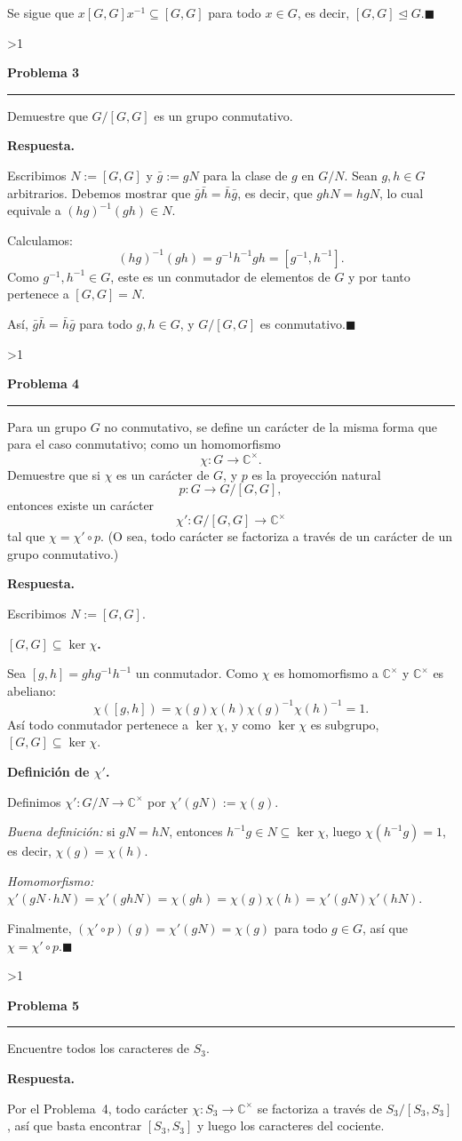 \documentclass[10pt,a4paper]{article}
\newcommand{\CC}{\mathbb{C}}
\newcommand{\inlinehead}[2][repblue]{%
  \par\smallskip
  {\color{#1}\bfseries #2.}\hspace{0.45em}%
}
\newcommand{\blockhead}[2][repteal]{%
  \par\smallskip
  {\color{#1}\bfseries #2.}\par\nobreak\smallskip
}
\newcommand{\answer}{\inlinehead{Respuesta}}
\newcommand{\subhead}[1]{\blockhead{#1}}
\newcounter{probcnt}
\newcommand{\problem}[2]{%
  \stepcounter{probcnt}%
  \ifnum\value{probcnt}>1\newpage\fi
  \par\vspace{0.25em}
  {\large\bfseries\color{repblue} Problema #1}\par
  {\color{repline}\rule{\linewidth}{0.55pt}}\par
  \begin{tcolorbox}[
    breakable,
    colback=white,
    colframe=repline,
    borderline west={1.6pt}{0pt}{repteal},
    left=0.7em,
    right=0.7em,
    top=0.35em,
    bottom=0.3em,
    before skip=0.35em,
    after skip=0.45em
  ]
    #2
  \end{tcolorbox}
}
\begin{document}
Se sigue que $x[G,G]x^{-1}\subseteq [G,G]$ para todo $x\in G$, es decir,
$[G,G]\trianglelefteq G$.\hfill$\blacksquare$

\problem{3}{%
Demuestre que $G/[G,G]$ es un grupo conmutativo.
}

\answer
Escribimos $N:=[G,G]$ y $\bar g:=gN$ para la clase de $g$ en $G/N$.
Sean $g,h\in G$ arbitrarios. Debemos mostrar que $\bar g\bar h=\bar h\bar g$,
es decir, que $ghN=hgN$, lo cual equivale a $(hg)^{-1}(gh)\in N$.

Calculamos:
\[
  (hg)^{-1}(gh)=g^{-1}h^{-1}gh=[g^{-1},h^{-1}].
\]
Como $g^{-1},h^{-1}\in G$, este es un conmutador de elementos de $G$ y por
tanto pertenece a $[G,G]=N$.

Así, $\bar g\bar h=\bar h\bar g$ para todo $g,h\in G$, y $G/[G,G]$ es
conmutativo.\hfill$\blacksquare$

\problem{4}{%
Para un grupo $G$ no conmutativo, se define un carácter de la misma forma
que para el caso conmutativo; como un homomorfismo
\[
  \chi \colon G \to \CC^\times.
\]
Demuestre que si $\chi$ es un carácter de $G$, y $p$ es la proyección natural
\[
  p \colon G \to G/[G,G],
\]
entonces existe un carácter
\[
  \chi' \colon G/[G,G] \to \CC^\times
\]
tal que $\chi = \chi' \circ p$. (O sea, todo carácter se factoriza a través
de un carácter de un grupo conmutativo.)
}

\answer
Escribimos $N:=[G,G]$.

\subhead{$[G,G]\subseteq\ker\chi$}
Sea $[g,h]=ghg^{-1}h^{-1}$ un conmutador. Como $\chi$ es homomorfismo a
$\CC^\times$ y $\CC^\times$ es abeliano:
\[
  \chi([g,h])
  =\chi(g)\chi(h)\chi(g)^{-1}\chi(h)^{-1}
  =1.
\]
Así todo conmutador pertenece a $\ker\chi$, y como $\ker\chi$ es subgrupo,
$[G,G]\subseteq\ker\chi$.

\subhead{Definición de $\chi'$}
Definimos $\chi'\colon G/N\to\CC^\times$ por $\chi'(gN):=\chi(g)$.

\emph{Buena definición:} si $gN=hN$, entonces $h^{-1}g\in N\subseteq\ker\chi$,
luego $\chi(h^{-1}g)=1$, es decir, $\chi(g)=\chi(h)$.

\emph{Homomorfismo:} $\chi'(gN\cdot hN)=\chi'(ghN)=\chi(gh)=\chi(g)\chi(h)
=\chi'(gN)\chi'(hN)$.

Finalmente, $(\chi'\circ p)(g)=\chi'(gN)=\chi(g)$ para todo $g\in G$,
así que $\chi=\chi'\circ p$.\hfill$\blacksquare$

\problem{5}{%
Encuentre todos los caracteres de $S_3$.
}

\answer
Por el Problema~4, todo carácter $\chi\colon S_3\to\CC^\times$ se
factoriza a través de $S_3/[S_3,S_3]$, así que basta encontrar
$[S_3,S_3]$ y luego los caracteres del cociente.
\end{document}
